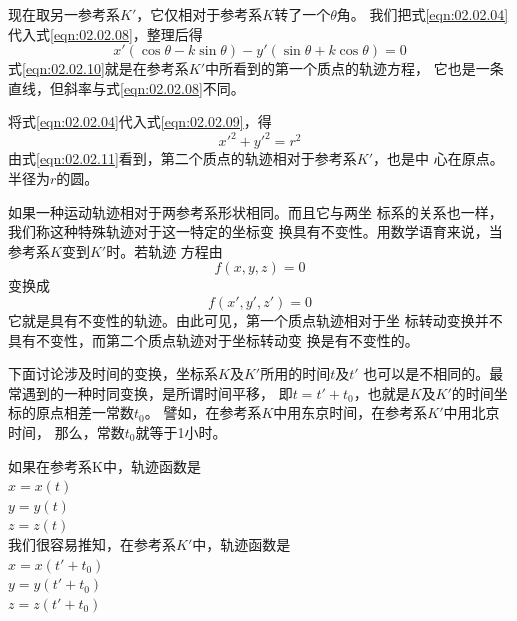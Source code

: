 现在取另一参考系$K'$，它仅相对于参考系$K$转了一个$\theta$角。
我们把式\eqref{eqn:02.02.04}代入式\eqref{eqn:02.02.08}，整理后得
{\setlength{\mathindent}{4em}
\begin{equation}\label{eqn:02.02.10}
  x'\left(\cos\theta - k\sin\theta\right)-y'\left(\sin\theta + k\cos\theta\right)=0
\end{equation}}%
式\eqref{eqn:02.02.10}就是在参考系$K'$中所看到的第一个质点的轨迹方程，
它也是一条直线，但斜率与式\eqref{eqn:02.02.08}不同。

将式\eqref{eqn:02.02.04}代入式\eqref{eqn:02.02.09}，得
\begin{equation}\label{eqn:02.02.11}
  x'^2+y'^2=r^2
\end{equation}
由式\eqref{eqn:02.02.11}看到，第二个质点的轨迹相对于参考系$K'$，也是中
心在原点。半径为$r$的圆。

如果一种运动轨迹相对于两参考系形状相同。而且它与两坐
标系的关系也一样，我们称这种特殊轨迹对于这一特定的坐标变
换具有不变性。用数学语育来说，当参考系$K$变到$K'$时。若轨迹
方程由
\begin{equation*}
  f\left(x,y,z\right)=0
\end{equation*}
变换成
\begin{equation*}
  f\left(x',y',z'\right)=0
\end{equation*}
它就是具有不变性的轨迹。由此可见，第一个质点轨迹相对于坐
标转动变换并不具有不变性，而第二个质点轨迹对于坐标转动变
换是有不变性的。

下面讨论涉及时间的变换，坐标系$K$及$K'$所用的时间$t$及$t'$
也可以是不相同的。最常遇到的一种时同变换，是所谓时间平移，
即$t=t'+t_0$，也就是$K$及$K'$的时间坐标的原点相差一常数$t_0$。
譬如，在参考系$K$中用东京时间，在参考系$K'$中用北京时间，
那么，常数$t_0$就等于1小时。

如果在参考系K中，轨迹函数是\vspace{-0.2em}
\\\null\hspace{6em}$x=x\left(t\right)$
\\\null\hspace{6em}$y=y\left(t\right)$
\\\null\hspace{6em}$z=z\left(t\right)$\\
我们很容易推知，在参考系$K'$中，轨迹函数是\vspace{-0.2em}
\\\null\hspace{6em}$x=x\left(t'+t_0\right)$
\\\null\hspace{6em}$y=y\left(t'+t_0\right)$
\\\null\hspace{6em}$z=z\left(t'+t_0\right)$

